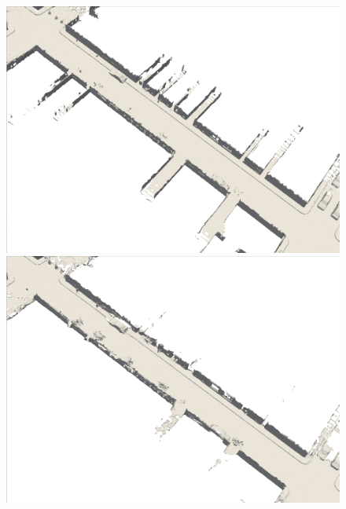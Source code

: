 \begin{figure}[htbp]
    \centering
\begin{minipage}{0.5\linewidth}
    \centering
    \includegraphics[width=1\linewidth]{figures/mai_3_vox.png}
\end{minipage}\hfill
\begin{minipage}{0.5\linewidth}
    \centering
    \includegraphics[width=1\linewidth]{figures/mai_3_bce.png}
\end{minipage}
\vfill
\begin{minipage}{0.5\linewidth}
    \centering

\end{minipage}
\end{figure}
